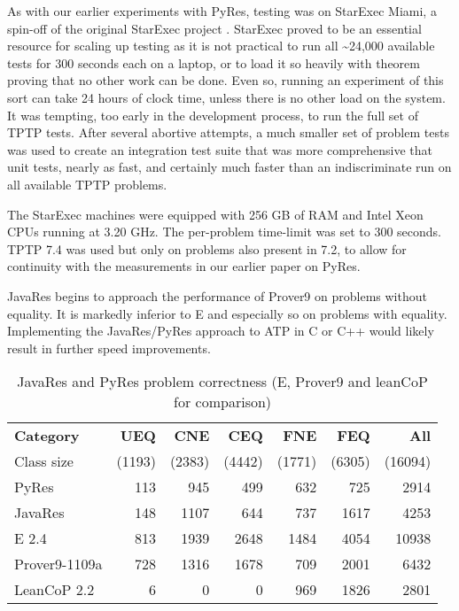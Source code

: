 \documentclass{llncs}
\begin{document}
As with our earlier experiments with PyRes, testing was on StarExec
Miami, a spin-off of the original StarExec project
\cite{SST:IJCAR-2014}. StarExec proved to be an essential resource for
scaling up testing as it is not practical to run all
\textasciitilde24,000 available tests for 300 seconds each on a
laptop, or to load it so heavily with theorem proving that no other
work can be done.  Even so, running an experiment of this sort can
take 24 hours of clock time, unless there is no other load on the
system. It was tempting, too early in the development process, to run
the full set of TPTP tests.  After several abortive attempts, a much
smaller set of problem tests was used to create an integration test
suite that was more comprehensive that unit tests, nearly as fast, and
certainly much faster than an indiscriminate run on all available TPTP
problems.

The StarExec machines were equipped with 256 GB of RAM and Intel Xeon
CPUs running at 3.20 GHz.  The per-problem time-limit was set to 300
seconds. TPTP 7.4 was used but only on problems also present in 7.2,
to allow for continuity with the measurements in our earlier paper on
PyRes.

JavaRes begins to approach the performance of Prover9 on problems without
equality. It is markedly inferior to E and especially so on problems
with equality.  Implementing the JavaRes/PyRes approach to ATP
in C or C++ would likely result in further speed improvements.

\begin{table}[tbh]
  \begin{tabular}{lrrrrrr}
    \hline
    \textbf{Category} & \textbf{UEQ} & \textbf{CNE} & \textbf{CEQ} & \textbf{FNE} & \textbf{FEQ} & \textbf{All}\\
    {\tiny Class size} & {\tiny (1193)} & {\tiny (2383)} & {\tiny (4442)} & {\tiny (1771)} & {\tiny (6305)} & {\tiny (16094)}\\
    \hline             %
    PyRes              &   113 &   945 &   499 &   632 &   725 &  2914 \\
    JavaRes            &   148 &  1107 &   644 &   737 &  1617 &  4253 \\
    \hline
    E 2.4              &   813 &  1939 &  2648 &  1484 &  4054 & 10938 \\
    Prover9-1109a      &   728 &  1316 &  1678 &   709 &  2001 &  6432 \\
    LeanCoP 2.2        &     6 &     0 &     0 &   969 &  1826 &  2801 \\
    \hline
  \end{tabular}
  \caption{JavaRes and PyRes problem correctness (E, Prover9 and leanCoP for comparison)}
  \label{tab:res}
\end{table}
\end{document}
